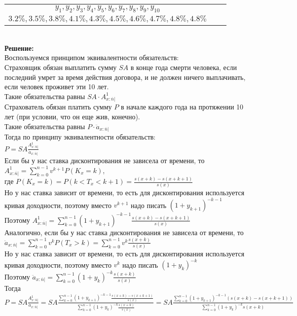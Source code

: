 \documentclass{article}
\begin{document}
 \begin{tabular}{ccc}
$y_1, y_2, y_3, y_4, y_5, y_6, y_7, y_8, y_9, y_{10}$\\
$3.2\% , 3.5\%, 3.8\%, 4.1\% , 4.3\%, 4.5\%, 4.6\% , 4.7\%, 4.8\%, 4.8\%$ \\
\end{tabular}\\

{\bf \large Решение:}\\
Воспользуемся принципом эквивалентности обязательств:\\
Страховщик обязан выплатить сумму $SA$ в конце года смерти человека, если последний умрет за время действия договора, 
и не должен ничего выплачивать, если человек проживет эти 10 лет. \\
Такие обязательства равны $SA \cdot  A_{x: \overline{n}| }^{1}$\\
Страхователь обязан платить сумму $P$ в начале каждого года на протяжении 10 лет (при условии, что он еще жив, конечно).\\
Такие обязательства равны $P  \cdot  \ddot a_{x: \overline{n}| } $\\
Тогда по принципу эквивалентности обязательств:\\
$P= SA \frac{  A_{x: \overline{n}| }^{1} }{   \ddot  a_{x: \overline{n}| }  }$\\

Если бы у нас ставка дисконтирования не зависела от времени, то\\
$A_{x: \overline{n}| }^{1} = \sum\limits_{k=0}^{n-1} v^{k+1} P(K_x = k)$, \\
где $P(K_x=k) = P(k < T_x < k+1) = \frac {s(x+k)-s(x+k+1)}{s(x)}$\\
Но у нас ставка зависит от времени, то есть для дисконтирования используется кривая доходности, поэтому вместо $v^{k+1} $ надо писать $(1+y_{k+1})^{-k-1}$\\
Поэтому $ A_{x: \overline{n}| }^{1} = \sum\limits_{k=0}^{n-1}  (1+y_{k+1})^{-k-1}  \frac {s(x+k)-s(x+k+1)}{s(x)}$\\

Аналогично, если бы у нас ставка дисконтирования не зависела от времени, то\\
$\ddot a_{x: \overline{n}| } = \sum\limits_{k=0}^{n-1} v^{k} P(T_x > k) =  \sum\limits_{k=0}^{n-1} v^{k} \frac {s(x+k)}{s(x)}$\\
Но у нас ставка зависит от времени, то есть для дисконтирования используется кривая доходности, поэтому вместо $v^{k} $ надо писать $(1+y_{k})^{-k}$\\
Поэтому $\ddot a_{x: \overline{n}| } = \sum\limits_{k=0}^{n-1} (1+y_{k})^{-k}  \frac {s(x+k)}{s(x)}$\\
Тогда $P= SA \frac{  A_{x: \overline{n}| }^{1} }{   \ddot  a_{x: \overline{n}| }  } 
= SA \frac{ \sum\limits_{k=0}^{n-1}  (1+y_{k+1})^{-k-1}  \frac {s(x+k)-s(x+k+1)}{s(x)}  }{  \sum\limits_{k=0}^{n-1} (1+y_{k})^{-k}  \frac {s(x+k)}{s(x)} }=
SA \frac{ \sum\limits_{k=0}^{n-1}  (1+y_{k+1})^{-k-1}  (s(x+k)-s(x+k+1)) }{  \sum\limits_{k=0}^{n-1} (1+y_{k})^{-k}  s(x+k) }$\\
\end{document}
